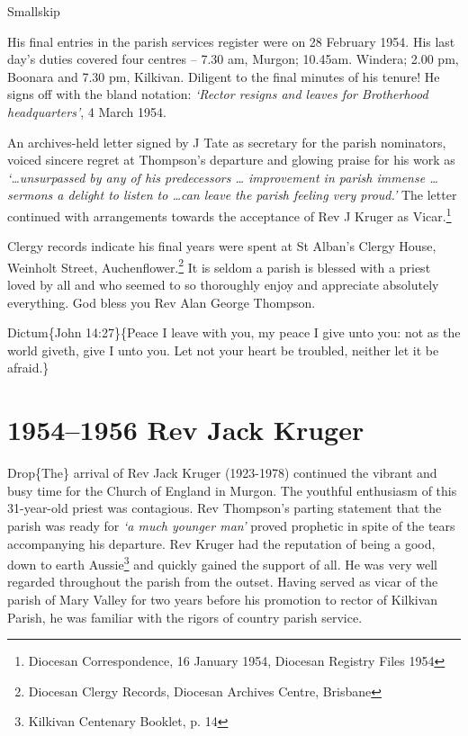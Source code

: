 Smallskip

His final entries in the parish services register were on 28 February 1954. His last day's duties covered four centres -- 7.30 am, Murgon; 10.45am. Windera; 2.00 pm, Boonara and 7.30 pm, Kilkivan. Diligent to the final minutes of his tenure! He signs off with the bland notation: \emph{`Rector resigns and leaves for Brotherhood headquarters'}, 4 March 1954.

An archives-held letter signed by J Tate as secretary for the parish nominators, voiced sincere regret at Thompson's departure and glowing praise for his work as \emph{`\ldots unsurpassed by any of his predecessors \ldots{} improvement in parish immense \ldots{} sermons a delight to listen to \ldots can leave the parish feeling very proud.'} The letter continued with arrangements towards the acceptance of Rev J Kruger as Vicar.\footnote{Diocesan Correspondence, 16 January 1954, Diocesan Registry Files 1954}

Clergy records indicate his final years were spent at St Alban's Clergy House, Weinholt Street, Auchenflower.\footnote{Diocesan Clergy Records, Diocesan Archives Centre, Brisbane} It is seldom a parish is blessed with a priest loved by all and who seemed to so thoroughly enjoy and appreciate absolutely everything. God bless you Rev Alan George Thompson.

Dictum\{John 14:27\}\{Peace I leave with you, my peace I give unto you: not as the world giveth, give I unto you. Let not your heart be troubled, neither let it be afraid.\}

\hypertarget{rev-jack-kruger}{%
\chapter{1954--1956 Rev Jack Kruger}\label{rev-jack-kruger}}

Drop\{The\} arrival of Rev Jack Kruger (1923-1978) continued the vibrant and busy time for the Church of England in Murgon. The youthful enthusiasm of this 31-year-old priest was contagious. Rev Thompson's parting statement that the parish was ready for \emph{`a much younger man'} proved prophetic in spite of the tears accompanying his departure. Rev Kruger had the reputation of being a good, down to earth Aussie\footnote{Kilkivan Centenary Booklet, p. 14} and quickly gained the support of all. He was very well regarded throughout the parish from the outset. Having served as vicar of the parish of Mary Valley for two years before his promotion to rector of Kilkivan Parish, he was familiar with the rigors of country parish service.

